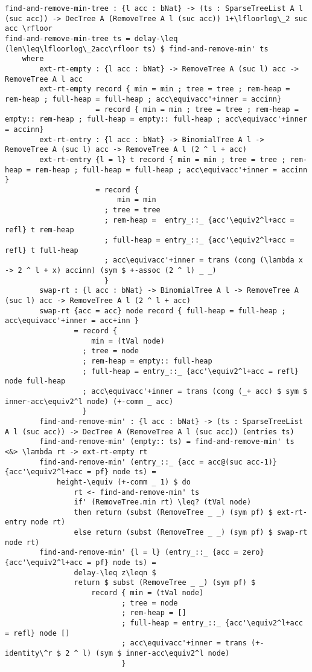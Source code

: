 \begin{lstlisting}[caption={Removing the minimum element},label={lst:appendix:heap:remove}]
find-and-remove-min-tree : {l acc : bNat} -> (ts : SparseTreeList A l (suc acc)) -> DecTree A (RemoveTree A l (suc acc)) 1+\lfloorlog\_2 suc acc \rfloor
find-and-remove-min-tree ts = delay-\leq (len\leq\lfloorlog\_2acc\rfloor ts) $ find-and-remove-min' ts
    where
        ext-rt-empty : {l acc : bNat} -> RemoveTree A (suc l) acc -> RemoveTree A l acc
        ext-rt-empty record { min = min ; tree = tree ; rem-heap = rem-heap ; full-heap = full-heap ; acc\equivacc'+inner = accinn}
                     = record { min = min ; tree = tree ; rem-heap = empty:: rem-heap ; full-heap = empty:: full-heap ; acc\equivacc'+inner = accinn}
        ext-rt-entry : {l acc : bNat} -> BinomialTree A l -> RemoveTree A (suc l) acc -> RemoveTree A l (2 ^ l + acc)
        ext-rt-entry {l = l} t record { min = min ; tree = tree ; rem-heap = rem-heap ; full-heap = full-heap ; acc\equivacc'+inner = accinn }
                     = record {
                          min = min
                       ; tree = tree
                       ; rem-heap =  entry_::_ {acc'\equiv2^l+acc = refl} t rem-heap
                       ; full-heap = entry_::_ {acc'\equiv2^l+acc = refl} t full-heap
                       ; acc\equivacc'+inner = trans (cong (\lambda x -> 2 ^ l + x) accinn) (sym $ +-assoc (2 ^ l) _ _)
                       }
        swap-rt : {l acc : bNat} -> BinomialTree A l -> RemoveTree A (suc l) acc -> RemoveTree A l (2 ^ l + acc)
        swap-rt {acc = acc} node record { full-heap = full-heap ; acc\equivacc'+inner = acc+inn }
                = record {
                    min = (tVal node)
                  ; tree = node
                  ; rem-heap = empty:: full-heap
                  ; full-heap = entry_::_ {acc'\equiv2^l+acc = refl} node full-heap
                  ; acc\equivacc'+inner = trans (cong (_+ acc) $ sym $ inner-acc\equiv2^l node) (+-comm _ acc)
                  }
        find-and-remove-min' : {l acc : bNat} -> (ts : SparseTreeList A l (suc acc)) -> DecTree A (RemoveTree A l (suc acc)) (entries ts)
        find-and-remove-min' (empty:: ts) = find-and-remove-min' ts <&> \lambda rt -> ext-rt-empty rt
        find-and-remove-min' (entry_::_ {acc = acc@(suc acc-1)} {acc'\equiv2^l+acc = pf} node ts) =
            height-\equiv (+-comm _ 1) $ do
                rt <- find-and-remove-min' ts
                if' (RemoveTree.min rt) \leq? (tVal node)
                then return (subst (RemoveTree _ _) (sym pf) $ ext-rt-entry node rt)
                else return (subst (RemoveTree _ _) (sym pf) $ swap-rt node rt)
        find-and-remove-min' {l = l} (entry_::_ {acc = zero} {acc'\equiv2^l+acc = pf} node ts) =
                delay-\leq z\leqn $
                return $ subst (RemoveTree _ _) (sym pf) $
                    record { min = (tVal node)
                           ; tree = node
                           ; rem-heap = []
                           ; full-heap = entry_::_ {acc'\equiv2^l+acc = refl} node []
                           ; acc\equivacc'+inner = trans (+-identity\^r $ 2 ^ l) (sym $ inner-acc\equiv2^l node)
                           }


\end{lstlisting}
